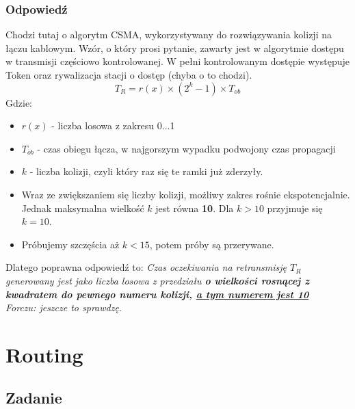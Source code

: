 		\subsubsection{Odpowiedź}
			Chodzi tutaj o algorytm CSMA, wykorzystywany do rozwiązywania kolizji na łączu kablowym. Wzór, o który prosi pytanie, zawarty jest w algorytmie dostępu w transmisji częściowo kontrolowanej. W pełni kontrolowanym dostępie występuje Token oraz rywalizacja stacji o dostęp (chyba o to chodzi).
			$$ T_{R} = r(x)\times (2^{k}-1)\times T_{ob}$$Gdzie:
			\begin{itemize}
				\item $ r(x) $ - liczba losowa z zakresu 0...1
				\item $ T_{ob} $ - czas obiegu łącza, w najgorszym wypadku podwojony czas propagacji
				\item $ k $ - liczba kolizji, czyli który raz się te ramki już zderzyły.
				\item Wraz ze zwiększaniem się liczby kolizji, możliwy zakres rośnie ekspotencjalnie. Jednak maksymalna wielkość $ k $ jest równa \textbf{10}. Dla $ k > 10 $ przyjmuje się $ k=10 $.
				\item Próbujemy szczęścia aż $ k < 15 $, potem próby są przerywane.
			\end{itemize}
			Dlatego poprawna odpowiedź to: \textit{Czas oczekiwania na retransmisję $ T_R $ generowany jest jako liczba losowa z przedziału \textbf{o wielkości rosnącej z kwadratem do pewnego numeru kolizji, \underline{a tym numerem jest 10}}}\\
			{\small \emph{Forczu: jeszcze to sprawdzę}}.
			
\section{Routing}
	\subsection{Zadanie}
